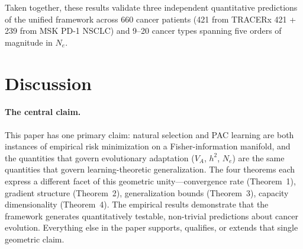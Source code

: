 \documentclass[12pt]{article}
\theoremstyle{remark}
\begin{document}
Taken together, these results validate three independent quantitative predictions of the unified framework across 660 cancer patients (421 from TRACERx 421 + 239 from MSK PD-1 NSCLC) and 9--20 cancer types spanning five orders of magnitude in $N_e$.

\section{Discussion}

\paragraph{The central claim.} This paper has one primary claim: natural selection and PAC learning are both instances of empirical risk minimization on a Fisher-information manifold, and the quantities that govern evolutionary adaptation ($V_A$, $h^2$, $N_e$) are the same quantities that govern learning-theoretic generalization. The four theorems each express a different facet of this geometric unity---convergence rate (Theorem~1), gradient structure (Theorem~2), generalization bounds (Theorem~3), capacity dimensionality (Theorem~4). The empirical results demonstrate that the framework generates quantitatively testable, non-trivial predictions about cancer evolution. Everything else in the paper supports, qualifies, or extends that single geometric claim.
\end{document}

